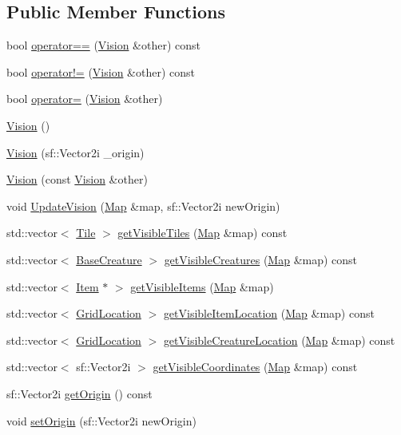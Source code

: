 \subsection*{Public Member Functions}
\begin{DoxyCompactItemize}
\item 
bool \mbox{\hyperlink{class_vision_a3d94cafed8244721a8bf62af5fe07bc0}{operator==}} (\mbox{\hyperlink{class_vision}{Vision}} \&other) const
\item 
bool \mbox{\hyperlink{class_vision_aae59cb11cc2ced8e1198f8c0c27b5f4b}{operator!=}} (\mbox{\hyperlink{class_vision}{Vision}} \&other) const
\item 
bool \mbox{\hyperlink{class_vision_a6e33c5769f73c0aa0d5cad335ddb4605}{operator=}} (\mbox{\hyperlink{class_vision}{Vision}} \&other)
\item 
\mbox{\hyperlink{class_vision_ad6899fb359fd485afbd309d6d7b0ae1f}{Vision}} ()
\item 
\mbox{\hyperlink{class_vision_a8a9d1c5ab532eb9318d41e10586ecc34}{Vision}} (sf\+::\+Vector2i \+\_\+origin)
\item 
\mbox{\hyperlink{class_vision_adf510da4361cd8d1c5fa689e41088d62}{Vision}} (const \mbox{\hyperlink{class_vision}{Vision}} \&other)
\item 
void \mbox{\hyperlink{class_vision_a626452b58aa651ff91e4e60a74ce7443}{Update\+Vision}} (\mbox{\hyperlink{class_map}{Map}} \&map, sf\+::\+Vector2i new\+Origin)
\item 
std\+::vector$<$ \mbox{\hyperlink{class_tile}{Tile}} $>$ \mbox{\hyperlink{class_vision_a52683d5635319444a095ad79d6745c3b}{get\+Visible\+Tiles}} (\mbox{\hyperlink{class_map}{Map}} \&map) const
\item 
std\+::vector$<$ \mbox{\hyperlink{class_base_creature}{Base\+Creature}} $>$ \mbox{\hyperlink{class_vision_ad8806902c3144f15827fd93c1aabfa06}{get\+Visible\+Creatures}} (\mbox{\hyperlink{class_map}{Map}} \&map) const
\item 
std\+::vector$<$ \mbox{\hyperlink{class_item}{Item}} $\ast$ $>$ \mbox{\hyperlink{class_vision_a57e240a165d83bd1869e4053af0a4569}{get\+Visible\+Items}} (\mbox{\hyperlink{class_map}{Map}} \&map)
\item 
std\+::vector$<$ \mbox{\hyperlink{struct_grid_location}{Grid\+Location}} $>$ \mbox{\hyperlink{class_vision_aaada841a563a60650e2261796ff18713}{get\+Visible\+Item\+Location}} (\mbox{\hyperlink{class_map}{Map}} \&map) const
\item 
std\+::vector$<$ \mbox{\hyperlink{struct_grid_location}{Grid\+Location}} $>$ \mbox{\hyperlink{class_vision_a8047527dbf01dfaafdb41493a5b615de}{get\+Visible\+Creature\+Location}} (\mbox{\hyperlink{class_map}{Map}} \&map) const
\item 
std\+::vector$<$ sf\+::\+Vector2i $>$ \mbox{\hyperlink{class_vision_adda6f028099b3685f4d822ba5c62ac47}{get\+Visible\+Coordinates}} (\mbox{\hyperlink{class_map}{Map}} \&map) const
\item 
sf\+::\+Vector2i \mbox{\hyperlink{class_vision_a4ff74199025d8054955f6bd335b5699d}{get\+Origin}} () const
\item 
void \mbox{\hyperlink{class_vision_a5f26ef8f946b7cf29e533797bf474954}{set\+Origin}} (sf\+::\+Vector2i new\+Origin)
\end{DoxyCompactItemize}
